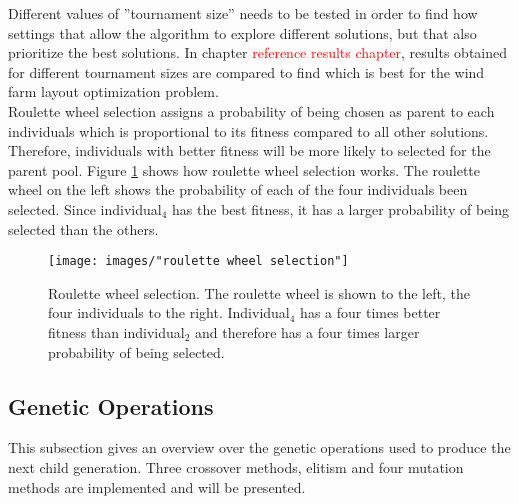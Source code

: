 \noindent Different values of ''tournament size'' needs to be tested in order to find how settings that allow the algorithm to explore different solutions, but that also prioritize the best solutions. In chapter \textcolor{red}{reference results chapter}, results obtained for different tournament sizes are compared to find which is best for the wind farm layout optimization problem. \\


\noindent Roulette wheel selection assigns a probability of being chosen as parent to each individuals which is proportional to its fitness compared to all other solutions. Therefore, individuals with better fitness will be more likely to selected for the parent pool. Figure \ref{figure:roulette wheel selection} shows how roulette wheel selection works. The roulette wheel on the left shows the probability of each of the four individuals been selected. Since individual$_4$ has the best fitness, it has a larger probability of being selected than the others. \\


\begin{figure}[h!]
\begin{center}
\texttt{[image: images/"roulette wheel selection"]}
\caption{Roulette wheel selection. The roulette wheel is shown to the left, the four individuals to the right. Individual$_4$ has a four times better fitness than individual$_2$ and therefore has a four times larger probability of being selected.}
\label{figure:roulette wheel selection}
\end{center}
\end{figure}


\subsection{Genetic Operations}\label{subsection:genetic operations}
This subsection gives an overview over the genetic operations used to produce the next child generation. Three crossover methods, elitism and four mutation methods are implemented and will be presented. 


